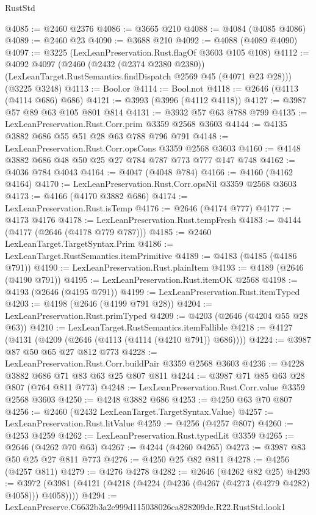 \begin{lexlean}{RustStd}
\begin{coremodule}
@4085 := @2460 @2376
@4086 := @3665 @210
@4088 := @4084 (@4085 @4086)
@4089 := @2460 @23
@4090 := @3688 @210
@4092 := @4088 (@4089 @4090)
@4097 := @3225 (LexLeanPreservation.Rust.flagOf @3603 @105 @108)
@4112 := @4092
    @4097
    (@2460
      (@2432 (@2374 @2380 @2380))
      (LexLeanTarget.RustSemantics.findDispatch @2569 @45 (@4071 @23 @28)))
    (@3225 @3248)
@4113 := Bool.or
@4114 := Bool.not
@4118 := @2646 (@4113 (@4114 @686) @686)
@4121 := @3993 (@3996 (@4112 @4118))
@4127 := @3987 @57 @89 @63 @105 @801 @814
@4131 := @3932 @57 @63 @788 @799
@4135 := LexLeanPreservation.Rust.Corr.prim @3359 @2568 @3603
@4144 := @4135 @3882 @686 @55 @51 @28 @63 @788 @796 @791
@4148 := LexLeanPreservation.Rust.Corr.opsCons @3359 @2568 @3603
@4160 := @4148 @3882 @686 @48 @50 @25 @27 @784 @787 @773 @777 @147 @748
@4162 := @4036 @784 @4043
@4164 := @4047 (@4048 @784)
@4166 := @4160 (@4162 @4164)
@4170 := LexLeanPreservation.Rust.Corr.opsNil @3359 @2568 @3603
@4173 := @4166 (@4170 @3882 @686)
@4174 := LexLeanPreservation.Rust.isTemp
@4176 := @2646 (@4174 @777)
@4177 := @4173 @4176
@4178 := LexLeanPreservation.Rust.tempFresh
@4183 := @4144 (@4177 (@2646 (@4178 @779 @787)))
@4185 := @2460 LexLeanTarget.TargetSyntax.Prim
@4186 := LexLeanTarget.RustSemantics.itemPrimitive
@4189 := @4183 (@4185 (@4186 @791))
@4190 := LexLeanPreservation.Rust.plainItem
@4193 := @4189 (@2646 (@4190 @791))
@4195 := LexLeanPreservation.Rust.itemOK @2568
@4198 := @4193 (@2646 (@4195 @791))
@4199 := LexLeanPreservation.Rust.itemTyped
@4203 := @4198 (@2646 (@4199 @791 @28))
@4204 := LexLeanPreservation.Rust.primTyped
@4209 := @4203 (@2646 (@4204 @55 @28 @63))
@4210 := LexLeanTarget.RustSemantics.itemFallible
@4218 := @4127 (@4131 (@4209 (@2646 (@4113 (@4114 (@4210 @791)) @686))))
@4224 := @3987 @87 @50 @65 @27 @812 @773
@4228 := LexLeanPreservation.Rust.Corr.buildPair @3359 @2568 @3603
@4236 := @4228 @3882 @686 @71 @83 @63 @25 @807 @811
@4244 := @3987 @71 @85 @63 @28 @807 (@764 @811 @773)
@4248 := LexLeanPreservation.Rust.Corr.value @3359 @2568 @3603
@4250 := @4248 @3882 @686
@4253 := @4250 @63 @70 @807
@4256 := @2460 (@2432 LexLeanTarget.TargetSyntax.Value)
@4257 := LexLeanPreservation.Rust.litValue
@4259 := @4256 (@4257 @807)
@4260 := @4253 @4259
@4262 := LexLeanPreservation.Rust.typedLit @3359
@4265 := @2646 (@4262 @70 @63)
@4267 := @4244 (@4260 @4265)
@4273 := @3987 @83 @50 @25 @27 @811 @773
@4276 := @4250 @25 @82 @811
@4278 := @4256 (@4257 @811)
@4279 := @4276 @4278
@4282 := @2646 (@4262 @82 @25)
@4293 := @3972 (@3981 (@4121 (@4218 (@4224 (@4236 (@4267 (@4273 (@4279 @4282) @4058))) @4058))))
@4294 := LexLeanPreserve.C6632b3a2e999d115038026ca828209de.R22.RustStd.look1

\end{coremodule}
\end{lexlean}
